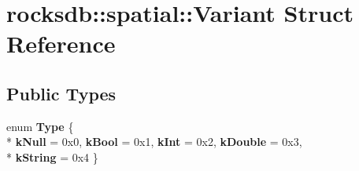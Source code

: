 \hypertarget{structrocksdb_1_1spatial_1_1Variant}{}\section{rocksdb\+:\+:spatial\+:\+:Variant Struct Reference}
\label{structrocksdb_1_1spatial_1_1Variant}
\subsection*{Public Types}
\begin{DoxyCompactItemize}
\item 
enum {\bfseries Type} \{ \\*
{\bfseries k\+Null} = 0x0, 
{\bfseries k\+Bool} = 0x1, 
{\bfseries k\+Int} = 0x2, 
{\bfseries k\+Double} = 0x3, 
\\*
{\bfseries k\+String} = 0x4
 \}\hypertarget{structrocksdb_1_1spatial_1_1Variant_af85905b6e4e46ab8031847c13861444a}{}\label{structrocksdb_1_1spatial_1_1Variant_af85905b6e4e46ab8031847c13861444a}

\end{DoxyCompactItemize}
